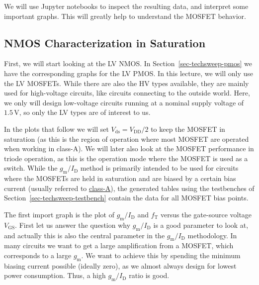 \documentclass[
  a4paper,
  DIV=11,
  numbers=noendperiod]{scrartcl}
\begin{document}
We will use Jupyter notebooks to inspect the resulting data, and
interpret some important graphs. This will greatly help to understand
the MOSFET behavior.

\subsection{NMOS Characterization in
Saturation}\label{sec-techsweep-nmos}

First, we will start looking at the LV NMOS. In
Section~\ref{sec-techsweep-pmos} we have the corresponding graphs for
the LV PMOS. In this lecture, we will only use the LV MOSFETs. While
there are also the HV types available, they are mainly used for
high-voltage circuits, like circuits connecting to the outside world.
Here, we only will design low-voltage circuits running at a nominal
supply voltage of \(1.5\,\text{V}\), so only the LV types are of
interest to us.

In the plots that follow we will set \(V_\mathrm{ds}= V_\mathrm{DD}/2\)
to keep the MOSFET in saturation (as this is the region of operation
where most MOSFET are operated when working in class-A). We will later
also look at the MOSFET performance in triode operation, as this is the
operation mode where the MOSFET is used as a switch. While the
\(g_\mathrm{m}/I_\mathrm{D}\) method is primarily intended to be used
for circuits where the MOSFETs are held in saturation and are biased by
a certain bias current (usually referred to
\href{https://en.wikipedia.org/wiki/Power_amplifier_classes\#Class_A}{class-A}),
the generated tables using the testbenches of
Section~\ref{sec-techsweep-testbench} contain the data for all MOSFET
bias points.

The first import graph is the plot of \(g_\mathrm{m}/I_\mathrm{D}\) and
\(f_\mathrm{T}\) versus the gate-source voltage \(V_\mathrm{GS}\). First
let us answer the question why \(g_\mathrm{m}/I_\mathrm{D}\) is a good
parameter to look at, and actually this is also the central parameter in
the \(g_\mathrm{m}/I_\mathrm{D}\) methodology. In many circuits we want
to get a large amplification from a MOSFET, which corresponds to a large
\(g_\mathrm{m}\). We want to achieve this by spending the minimum
biasing current possible (ideally zero), as we almost always design for
lowest power consumption. Thus, a high \(g_\mathrm{m}/I_\mathrm{D}\)
ratio is good.
\end{document}
